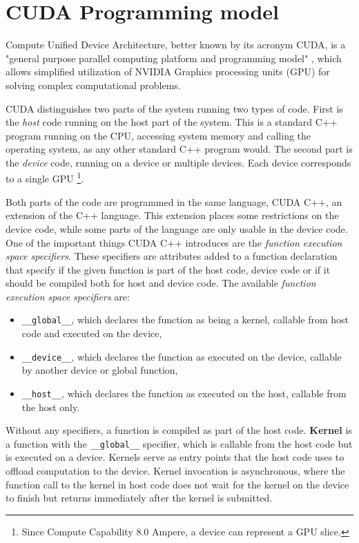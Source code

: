

\section{CUDA Programming model}
\label{sec:programming_model}

Compute Unified Device Architecture, better known by its acronym CUDA, is a "general purpose parallel computing platform and programming model" \citep{site:cuda}, which allows simplified utilization of NVIDIA Graphics processing units (GPU) for solving complex computational problems.

CUDA distinguishes two parts of the system running two types of code. First is the \textit{host} code running on the host part of the system. This is a standard C++ program running on the CPU, accessing system memory and calling the operating system, as any other standard C++ program would. The second part is the \textit{device} code, running on a device or multiple devices. Each device corresponds to a single GPU \footnote{Since Compute Capability 8.0 Ampere, a device can represent a GPU slice.}.

Both parts of the code are programmed in the same language, CUDA C++, an extension of the C++ language. This extension places some restrictions on the device code, while some parts of the language are only usable in the device code.
One of the important things CUDA C++ introduces are the \textit{function execution space specifiers}. These specifiers are attributes added to a function declaration that specify if the given function is part of the host code, device code or if it should be compiled both for host and device code. The available \textit{function execution space specifiers} are:
\begin{itemize}
	\item \texttt{\_\_global\_\_}, which declares the function as being a kernel, callable from host code and executed on the device,
	\item \texttt{\_\_device\_\_}, which declares the function as executed on the device, callable by another device or global function,
	\item \texttt{\_\_host\_\_}, which declares the function as executed on the host, callable from the host only.
\end{itemize}

Without any specifiers, a function is compiled as part of the host code. \textbf{Kernel} is a function with the \texttt{\_\_global\_\_} specifier, which is callable from the host code but is executed on a device. Kernels serve as entry points that the host code uses to offload computation to the device. Kernel invocation is asynchronous, where the function call to the kernel in host code does not wait for the kernel on the device to finish but returns immediately after the kernel is submitted.


